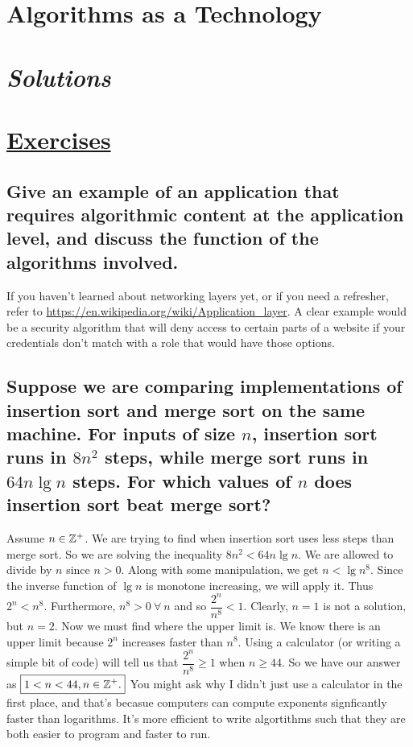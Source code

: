 \section{Algorithms as a Technology}
\section*{\textit{Solutions}}
\section*{\underline{Exercises}}
\subsection
{Give an example of an application that requires algorithmic content at the application
level, and discuss the function of the algorithms involved.}
If you haven't learned about networking layers yet, or if you need a refresher, refer to 
\url{https://en.wikipedia.org/wiki/Application_layer}. A clear example would be a security algorithm that will deny 
access to certain parts of a website if your credentials don't match with a role that would have those options.
\subsection
{Suppose we are comparing implementations of insertion sort and merge sort on the
same machine. For inputs of size $n$, insertion sort runs in $8n^2$ steps, while merge
sort runs in $64n\lg{n}$ steps. For which values of $n$ does insertion sort beat merge
sort?}
Assume $n \in \mathbb{Z}^+$. We are trying to find when insertion sort uses less steps than merge sort. So we are solving the 
inequality $8n^2 < 64n\lg{n}$. We are allowed to divide by $n$ since $n>0$. Along with some manipulation, we get 
$n < \lg{n^8}$. Since the inverse function of $\lg n$ is monotone increasing, we will apply it. Thus $2^n < n^8$.
Furthermore, $n^8 > 0\ \forall\ n$ and so $\dfrac{2^n}{n^8} < 1$. Clearly, $n = 1$ is not a solution, but $n=2$. Now we
must find where the upper limit is. We know there is an upper limit because $2^n$ increases faster than $n^8$. Using
a calculator (or writing a simple bit of code) will tell us that $\dfrac{2^n}{n^8} \geq 1$ when $n \geq 44$. So we have
our answer as $\boxed{1 < n < 44, n \in \mathbb{Z}^+.}$ You might ask why I didn't just use a calculator in the first 
place, and that's becasue computers can compute exponents signficantly faster than logarithms. It's more efficient to 
write algortithms such that they are both easier to program and faster to run.
